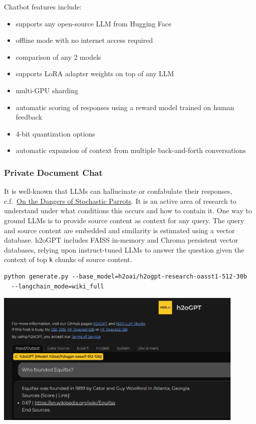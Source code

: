 \documentclass{article}
\begin{document}
Chatbot features include:

\begin{itemize}
    \item supports any open-source LLM from Hugging Face
    \item offline mode with no internet access required
    \item comparison of any 2 models
    \item supports LoRA adapter weights on top of any LLM
    \item multi-GPU sharding
    \item automatic scoring of responses using a reward model trained on human feedback
    \item 4-bit quantization options
    \item automatic expansion of context from multiple back-and-forth conversations
\end{itemize}

\subsubsection{Private Document Chat}
It is well-known that LLMs can hallucinate or confabulate their responses, c.f.~\href{https://dl.acm.org/doi/10.1145/3442188.3445922}{On the Dangers of Stochastic Parrots}. It is an active area of research to understand under what conditions this occurs and how to contain it. One way to ground LLMs is to provide source content as context for any query. The query and source content are embedded and similarity is estimated using a vector database. h2oGPT includes FAISS in-memory and Chroma persistent vector databases, relying upon instruct-tuned LLMs to answer the question given the context of top \texttt{k} chunks of source content.

\begin{verbatim}
python generate.py --base_model=h2oai/h2ogpt-research-oasst1-512-30b 
  --langchain_mode=wiki_full
\end{verbatim}

\begin{center}
  \includegraphics[width=0.9\textwidth]{images/langchain.png}  
\end{center}
\end{document}
